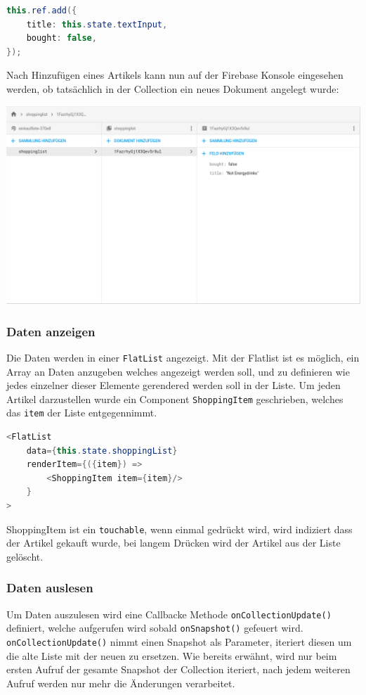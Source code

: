 \begin{lstlisting}[language=java]
this.ref.add({
	title: this.state.textInput,
	bought: false,
});
\end{lstlisting}

\clearpage
Nach Hinzufügen eines Artikels kann nun auf der Firebase Konsole \cite{Firebase65:online} eingesehen werden, ob tatsächlich in der Collection ein neues Dokument angelegt wurde:

\begin{minipage}{\linewidth}
	\centering
	\includegraphics[width=1\linewidth]{images/3}
\end{minipage}
\subsubsection{Daten anzeigen}
Die Daten werden in einer \verb|FlatList| angezeigt. Mit der Flatlist ist es möglich, ein Array an Daten anzugeben welches angezeigt werden soll, und zu definieren wie jedes einzelner dieser Elemente gerendered werden soll in der Liste. Um jeden Artikel darzustellen wurde ein Component \verb|ShoppingItem| geschrieben, welches das \verb|item| der Liste entgegennimmt.

\begin{lstlisting}[language=java]
<FlatList
	data={this.state.shoppingList}
	renderItem={({item}) => 
		<ShoppingItem item={item}/> 
	}
>
\end{lstlisting}
ShoppingItem ist ein \verb|touchable|, wenn einmal gedrückt wird, wird indiziert dass der Artikel gekauft wurde, bei langem Drücken wird der Artikel aus der Liste gelöscht. 

\subsubsection{Daten auslesen}
Um Daten auszulesen wird eine Callbacke Methode \verb|onCollectionUpdate()| definiert, welche aufgerufen wird sobald \verb|onSnapshot()| gefeuert wird. \verb|onCollectionUpdate()| nimmt einen Snapshot als Parameter, iteriert diesen um die alte Liste mit der neuen zu ersetzen. Wie bereits erwähnt, wird nur beim ersten Aufruf der gesamte Snapshot der Collection iteriert, nach jedem weiteren Aufruf werden nur mehr die Änderungen verarbeitet. 

